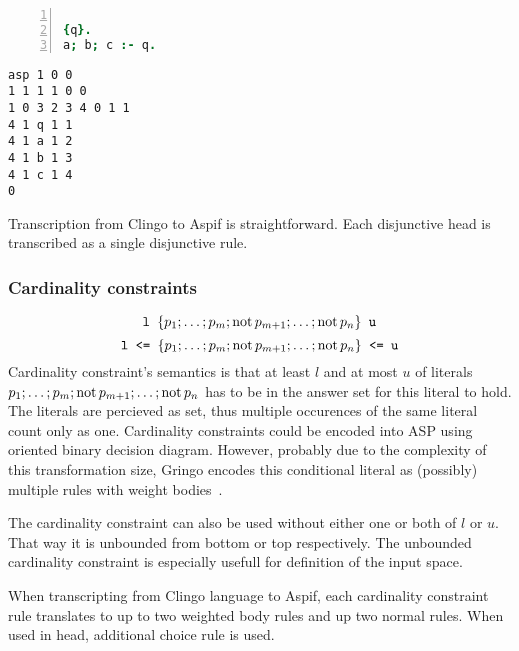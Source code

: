 \documentclass[
    digital,
    color,
    oneside,
    sansbold,
    lot,
    nolof
]{fithesis}
\begin{document}
\begin{minipage}[t]{0.45\linewidth}
\centering
\begin{lstlisting}[language=prolog, numbers=left, countblanklines=false]

{q}.
a; b; c :- q.
\end{lstlisting}
\end{minipage}
\hspace{1em}
\begin{minipage}[t]{0.45\linewidth}
\centering
\begin{lstlisting}[numbers=right, countblanklines=false]
asp 1 0 0
1 1 1 1 0 0
1 0 3 2 3 4 0 1 1
4 1 q 1 1
4 1 a 1 2
4 1 b 1 3
4 1 c 1 4
0
\end{lstlisting}
\end{minipage}
Transcription from Clingo to Aspif is straightforward. Each disjunctive head
is transcribed as a single disjunctive rule.

\subsubsection{Cardinality constraints}

\begin{equation*}
    \texttt{l }\{p_1; \dots; p_m; \mathrm{not}\, p_{m+1}; \dots; \mathrm{not}\, p_n\}\texttt{ u}
\end{equation*}
\begin{equation*}
    \texttt{l <= }\{p_1; \dots; p_m; \mathrm{not}\, p_{m+1}; \dots; \mathrm{not}\, p_n\}\texttt{ <= u}
\end{equation*}
Cardinality constraint's semantics is that
at least $l$ and at most $u$ of literals
$p_1; \dots; p_m; \mathrm{not}\, p_{m+1}; \dots; \mathrm{not}\, p_n$
has to be in the answer set for this literal to hold.
The literals are percieved as set, thus multiple occurences of the same literal
count only as one.
Cardinality constraints
could be encoded into ASP using oriented binary decision diagram.
However, probably due to the complexity of this transformation size, Gringo
encodes this conditional literal as (possibly) multiple rules with weight
bodies~\cite{aspEasy2016}.

The cardinality constraint can also be used without either one or both of
$l$ or $u$. That way it is unbounded from bottom or top respectively. The
unbounded cardinality constraint is especially usefull for definition
of the input space.

When transcripting from Clingo language to Aspif, each cardinality constraint
rule translates to up to two weighted body rules and up two normal rules.
When used in head, additional choice rule is used.
\end{document}
